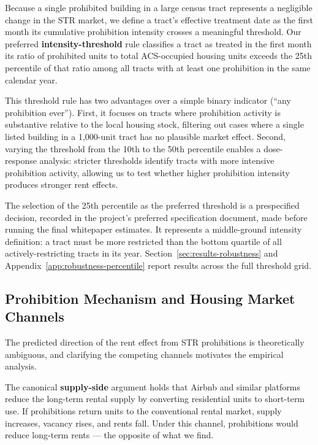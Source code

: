 Because a single prohibited building in a large census tract represents a negligible change in the STR market, we define a tract's effective treatment date as the first month its cumulative prohibition intensity crosses a meaningful threshold. Our preferred \textbf{intensity-threshold} rule classifies a tract as treated in the first month its ratio of prohibited units to total ACS-occupied housing units exceeds the 25th percentile of that ratio among all tracts with at least one prohibition in the same calendar year.

This threshold rule has two advantages over a simple binary indicator (``any prohibition ever''). First, it focuses on tracts where prohibition activity is substantive relative to the local housing stock, filtering out cases where a single listed building in a 1,000-unit tract has no plausible market effect. Second, varying the threshold from the 10th to the 50th percentile enables a dose-response analysis: stricter thresholds identify tracts with more intensive prohibition activity, allowing us to test whether higher prohibition intensity produces stronger rent effects.

The selection of the 25th percentile as the preferred threshold is a prespecified decision, recorded in the project's preferred specification document, made before running the final whitepaper estimates. It represents a middle-ground intensity definition: a tract must be more restricted than the bottom quartile of all actively-restricting tracts in its year. Section~\ref{sec:results-robustness} and Appendix~\ref{app:robustness-percentile} report results across the full threshold grid.

\subsection{Prohibition Mechanism and Housing Market Channels}

The predicted direction of the rent effect from STR prohibitions is theoretically ambiguous, and clarifying the competing channels motivates the empirical analysis.

The canonical \textbf{supply-side} argument holds that Airbnb and similar platforms reduce the long-term rental supply by converting residential units to short-term use. If prohibitions return units to the conventional rental market, supply increases, vacancy rises, and rents fall. Under this channel, prohibitions would reduce long-term rents --- the opposite of what we find.

